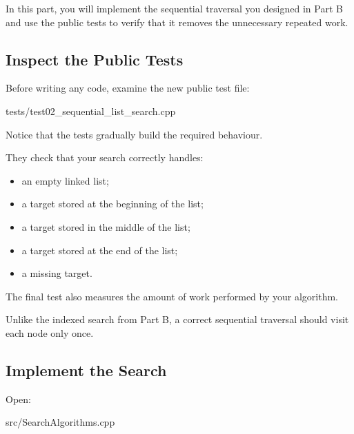 \documentclass{csc2059practical}
\begin{document}
In this part, you will implement the sequential traversal you designed in
Part B and use the public tests to verify that it removes the unnecessary
repeated work.


\subsection{Inspect the Public Tests}

Before writing any code, examine the new public test file:

\begin{terminal}
tests/test02_sequential_list_search.cpp
\end{terminal}

Notice that the tests gradually build the required behaviour.

They check that your search correctly handles:

\begin{itemize}
    \item an empty linked list;
    \item a target stored at the beginning of the list;
    \item a target stored in the middle of the list;
    \item a target stored at the end of the list;
    \item a missing target.
\end{itemize}

The final test also measures the amount of work performed by your algorithm.

Unlike the indexed search from Part B, a correct sequential traversal should
visit each node only once.


\subsection{Implement the Search}

Open:

\begin{terminal}
src/SearchAlgorithms.cpp
\end{terminal}
\end{document}
